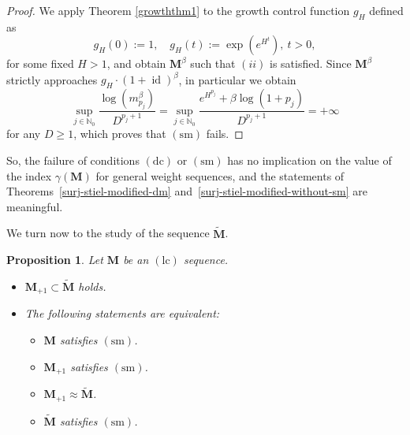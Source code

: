 \documentclass[12pt,a4paper]{article}
\newcommand{\M}{{\boldsymbol{M}}}
\newcommand{\id}{\operatorname{id}}
\newcommand{\lc}{\operatorname{(lc)}}
\newcommand{\dc}{\operatorname{(dc)}}
\newcommand{\sm}{\operatorname{(sm)}}
\newcommand{\ga}{\gamma}
\theoremstyle{plain}
\newtheorem{proposition}[theorem]{Proposition}
\theoremstyle{definition}
\numberwithin{equation}{section}
\begin{document}
\begin{proof}
We apply Theorem \ref{growththm1} to the growth control function $g_{H}$ defined as
$$
g_H(0):=1,\quad g_H(t):=\exp(e^{H^t}),\ t>0,
$$
for some fixed $H>1$, and obtain $\M^{\beta}$ such that $(ii)$ is satisfied.
Since $\boldsymbol{M}^{\beta}$ strictly approaches $g_{H}\cdot(1+\id)^{\beta}$, in particular we obtain
$$
\sup_{j\in\mathbb{N}_0}\frac{\log(m^{\beta}_{p_j})}{D^{p_j+1}}
=\sup_{j\in\mathbb{N}_0} \frac{e^{H^{p_j}}+\beta\log(1+p_j)}{D^{p_j+1}}=+\infty
$$
for any $D\ge 1$, which proves that $\sm$ fails.
\end{proof}

So, the failure of conditions $\dc$ or $\sm$ has no implication on the value of the index $\ga(\M)$ for general weight sequences, and  the statements of Theorems~\ref{surj-stiel-modified-dm} and~\ref{surj-stiel-modified-without-sm} are meaningful.


We turn now to the study of the sequence $\widetilde{\M}$.

\begin{proposition}\label{prop.study_sm}
Let $\M$ be an $\lc$ sequence.
\begin{itemize}
\item[$(i)$] $\M_{+1}\subset\widetilde{\M}$ holds.
\item[$(ii)$] The following statements are equivalent:
\begin{itemize}
\item[(1)] $\M$ satisfies $\sm$.
\item[(2)] $\M_{+1}$ satisfies $\sm$.
\item[(3)] $\M_{+1}\approx\widetilde{\M}$.
\item[(4)] $\widetilde{\M}$ satisfies $\sm$.
\end{itemize}
\end{itemize}
\end{proposition}
\end{document}
